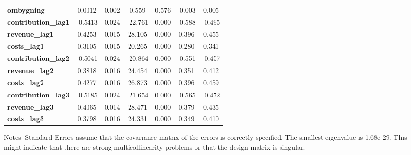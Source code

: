 \begin{center}
\begin{tabular}{lcccccc}
\textbf{ombygning}                        &       0.0012  &        0.002     &     0.559  &         0.576        &       -0.003    &        0.005     \\
\textbf{contribution\_lag1}               &      -0.5413  &        0.024     &   -22.761  &         0.000        &       -0.588    &       -0.495     \\
\textbf{revenue\_lag1}                    &       0.4253  &        0.015     &    28.105  &         0.000        &        0.396    &        0.455     \\
\textbf{costs\_lag1}                      &       0.3105  &        0.015     &    20.265  &         0.000        &        0.280    &        0.341     \\
\textbf{contribution\_lag2}               &      -0.5041  &        0.024     &   -20.864  &         0.000        &       -0.551    &       -0.457     \\
\textbf{revenue\_lag2}                    &       0.3818  &        0.016     &    24.454  &         0.000        &        0.351    &        0.412     \\
\textbf{costs\_lag2}                      &       0.4277  &        0.016     &    26.873  &         0.000        &        0.396    &        0.459     \\
\textbf{contribution\_lag3}               &      -0.5185  &        0.024     &   -21.654  &         0.000        &       -0.565    &       -0.472     \\
\textbf{revenue\_lag3}                    &       0.4065  &        0.014     &    28.471  &         0.000        &        0.379    &        0.435     \\
\textbf{costs\_lag3}                      &       0.3798  &        0.016     &    24.331  &         0.000        &        0.349    &        0.410     \\
\bottomrule
\end{tabular}
\end{center}

Notes: \newline
 [1] Standard Errors assume that the covariance matrix of the errors is correctly specified. \newline
 [2] The smallest eigenvalue is 1.68e-29. This might indicate that there are \newline
 strong multicollinearity problems or that the design matrix is singular.